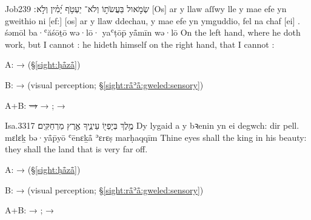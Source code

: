 \begin{example}{Job}{23}{9}{}{}
	\quoling
	{שְׂמֹ֣אול בַּעֲשֹׂת֣וֹ וְלֹא־ יַעְטֹ֥ף יָ֝מִ֗ין וְלֹ֣א ׃}
	{[Os] ar y llaw aſſwy lle y mae efe yn gweithio ni  [ef:] [os] ar y llaw ddechau, y mae efe yn ymguddio, fel na chaf [ei] .}
	{śəmōl ba·ʿăśōṯō wə·lō· yaʿṭōp̄ yå̄mīn wə·lō }
	{On the left hand, where he doth work, but I cannot  : he hideth himself on the right hand, that I cannot  :}
\end{example}
\begin{compactdesc}
	\item[A:]  →  (§\ref{sight:ḥå̄zå̄})
	\item[B:]  →  (visual perception; §\ref{sight:rå̄ʾå̄:gweled:sensory})
	\item[A+B:]  \sout{→ } → ;  → 
\end{compactdesc}

\begin{example}{Isa.}{33}{17}{}{}
	\quoling
	{מֶ֥לֶךְ בְּיָפְי֖וֹ  עֵינֶ֑יךָ  אֶ֥רֶץ מַרְחַקִּֽים׃}
	{Dy lygaid a  y bꝛenin yn ei degwch:  dir pell.}
	{mɛlɛḵ bə·yå̄p̄yō  ʿēnɛḵå̄  ʾɛrɛṣ marḥaqqīm}
	{Thine eyes shall  the king in his beauty: they shall  the land that is very far off.}
\end{example}
\begin{compactdesc}
	\item[A:]  →  (§\ref{sight:ḥå̄zå̄})
	\item[B:]  →  (visual perception; §\ref{sight:rå̄ʾå̄:gweled:sensory})
	\item[A+B:]  → ;  → 
\end{compactdesc}
